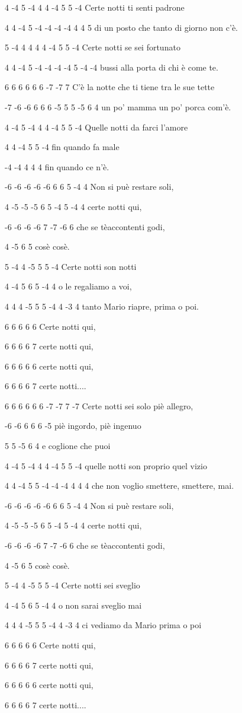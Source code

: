 4 -4  5 -4  4  4  -4  5  5  -4
Certe notti ti senti padrone 

4 4 -4 5  -4 -4 -4 -4 4 4  5
di un posto che tanto di giorno non c'è.

5 -4  4  4  4  4  -4  5  5  -4
Certe notti se sei fortunato 

4  4 -4   5  -4 -4 -4 -4  5  -4  -4
bussi alla porta di chi è come te.

6   6 6   6  6 6 -7   -7  7
C'è la notte che ti tiene tra le sue tette

-7 -6 -6  6  6  6 -5  5  5 -5   6  4
 un po' mamma un po' porca com'è.

4 -4  5 -4  4  4  -4  5  5  -4
Quelle notti da farci l'amore 

4   4  -4  5 5 -4 
fin quando fa male 

-4 -4   4  4  4
fin quando ce n'è.

-6 -6 -6 -6 -6 6  6 5  -4 4
Non si puè restare soli, 

4  -5 -5 -5  6  5 -4 5 -4 4
certe notti qui, 

-6   -6 -6  -6  7 -7 -6 6
che  se tèaccontenti godi,

4 -5 6  5
cosè cosè.

5  -4  4 -5   5  5 -4
Certe notti son notti 

4 -4   5 6  5  -4  4
o le regaliamo a voi, 

4  4  4 -5  5  5 -4  4  -3 4
tanto Mario riapre, prima o poi.

6   6   6   6  6
Certe notti qui, 

6   6  6  6  7
certe notti qui, 

6   6  6  6  6
certe notti qui, 

6   6  6  6  7
certe notti....

6   6 6   6  6  6  -7 -7  7  -7
Certe notti sei solo piè allegro,

-6  -6 6  6   6  -5  
piè ingordo, piè ingenuo 

5  5  -5    6  4
e coglione che puoi

4 -4  5 -4  4  4  -4  5  5  -4
quelle notti son proprio quel vizio 

4   4  -4  5 5 -4 -4 -4   4  4  4
che non voglio smettere, smettere, mai.

-6 -6 -6 -6 -6 6  6 5  -4 4
Non si puè restare soli, 

4  -5 -5 -5  6  5 -4 5 -4 4
certe notti qui, 

-6   -6 -6  -6  7 -7 -6 6
che  se tèaccontenti godi,

4 -5 6  5
cosè cosè.

5  -4  4 -5   5  5 -4
Certe notti sei sveglio 

4 -4   5  6  5  -4  4
o non sarai sveglio mai

4  4  4 -5  5  5 -4  4  -3  4
ci vediamo da Mario prima o poi

6   6   6   6  6
Certe notti qui, 

6   6  6  6  7
certe notti qui, 

6   6  6  6  6
certe notti qui, 

6   6  6  6  7
certe notti....
\endverse
\endsong